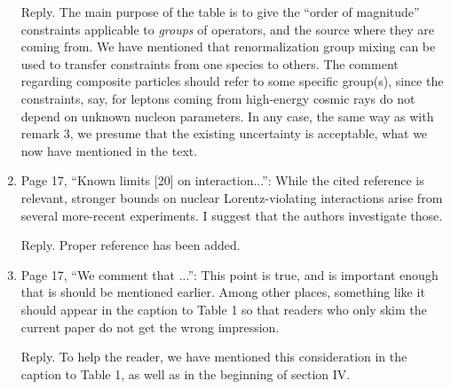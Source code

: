 \documentclass[12pt,preprintnumbers,nofootinbib]{revtex4}
\begin{document}
\begin{enumerate}
Reply. The main purpose of the table is to give the ``order of magnitude''
constraints applicable to {\it groups} of operators, and the source where
they are coming from. We have mentioned that renormalization group mixing can 
be used to transfer constraints from one species to others. 
The comment regarding composite particles should refer to some specific group(s), 
since the constraints, say, for leptons coming from high-energy cosmic rays 
do not depend on unknown nucleon parameters.
In any case, the same way as with remark 3, we presume that the existing 
uncertainty is acceptable, what we now have mentioned in the text.

\item Page 17, ``Known limits [20] on interaction...'':
 While the cited reference is relevant,
 stronger bounds on nuclear Lorentz-violating interactions
 arise from several more-recent experiments.
 I suggest that the authors investigate those.

Reply. Proper reference has been added.

\item Page 17, ``We comment that ...'':
 This point is true, and is important enough that is should be mentioned
earlier.
 Among other places, something like it should appear in the caption to Table 1
 so that readers who only skim the current paper do not get the wrong
impression.  

Reply. To help the reader, we have mentioned this consideration in the 
caption to Table 1, as well as in the beginning of section IV. 

\end{enumerate}
\end{document}
